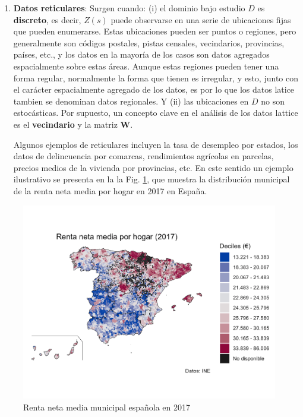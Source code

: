 \documentclass[
]{book}
\theoremstyle{definition}
\theoremstyle{definition}
\theoremstyle{definition}
\theoremstyle{definition}
\theoremstyle{remark}
\begin{document}
\begin{enumerate}
\def\labelenumi{\arabic{enumi}.}
\setcounter{enumi}{1}
\item
  \textbf{Datos reticulares}: Surgen cuando: (i) el dominio bajo estudio \(D\) es
  \textbf{discreto}, es decir, \(Z(s)\) puede observarse en una serie de ubicaciones
  fijas que pueden enumerarse. Estas ubicaciones pueden ser puntos o regiones,
  pero generalmente son códigos postales, pistas censales, vecindarios,
  provincias, países, etc., y los datos en la mayoría de los casos son datos
  agregados espacialmente sobre estas áreas. Aunque estas regiones pueden
  tener una forma regular, normalmente la forma que tienen es irregular, y
  esto, junto con el carácter espacialmente agregado de los datos, es por lo
  que los datos latice tambien se denominan datos regionales. Y (ii) las
  ubicaciones en \(D\) no son estocásticas. Por supuesto, un concepto clave en
  el análisis de los datos lattice es el \textbf{vecindario} y la matriz \textbf{W}.

  Algunos ejemplos de reticulares incluyen la tasa de desempleo por estados,
  los datos de delincuencia por comarcas, rendimientos agrícolas en parcelas,
  precios medios de la vivienda por provincias, etc. En este sentido un
  ejemplo ilustrativo se presenta en la la Fig. \ref{fig:ejem-lattice}, que
  muestra la distribución municipal de la renta neta media por hogar en 2017
  en España.
\end{enumerate}

\begin{figure}

{\centering \includegraphics[width=0.6\linewidth]{img/renta2017} 

}

\caption{Renta neta media municipal española en 2017}\label{fig:ejem-lattice}
\end{figure}
\end{document}
